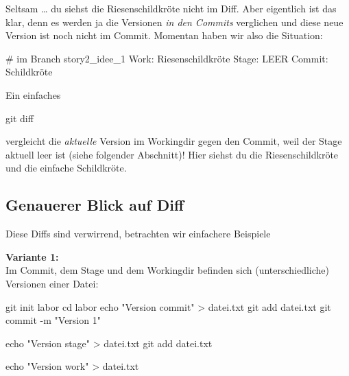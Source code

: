 \documentclass[
  letterpaper,
  DIV=11]{scrreprt}
\newenvironment{Shaded}{\begin{snugshade}}{\end{snugshade}}
\newcommand{\AttributeTok}[1]{\textcolor[rgb]{0.40,0.45,0.13}{#1}}
\newcommand{\BuiltInTok}[1]{\textcolor[rgb]{0.00,0.23,0.31}{#1}}
\newcommand{\CommentTok}[1]{\textcolor[rgb]{0.37,0.37,0.37}{#1}}
\newcommand{\ExtensionTok}[1]{\textcolor[rgb]{0.00,0.23,0.31}{#1}}
\newcommand{\FunctionTok}[1]{\textcolor[rgb]{0.28,0.35,0.67}{#1}}
\newcommand{\NormalTok}[1]{\textcolor[rgb]{0.00,0.23,0.31}{#1}}
\newcommand{\OperatorTok}[1]{\textcolor[rgb]{0.37,0.37,0.37}{#1}}
\newcommand{\StringTok}[1]{\textcolor[rgb]{0.13,0.47,0.30}{#1}}
\begin{document}
Seltsam \ldots{} du siehst die Riesenschildkröte nicht im Diff. Aber
eigentlich ist das klar, denn es werden ja die Versionen \emph{in den
Commits} verglichen und diese neue Version ist noch nicht im Commit.
Momentan haben wir also die Situation:

\begin{Shaded}
\begin{Highlighting}[]
\CommentTok{\# im Branch story2\_idee\_1}
\ExtensionTok{Work:}\NormalTok{   Riesenschildkröte}
\ExtensionTok{Stage:}\NormalTok{  LEER}
\ExtensionTok{Commit:}\NormalTok{ Schildkröte}
\end{Highlighting}
\end{Shaded}

Ein einfaches

\begin{Shaded}
\begin{Highlighting}[]
\FunctionTok{git}\NormalTok{ diff }
\end{Highlighting}
\end{Shaded}

vergleicht die \emph{aktuelle} Version im Workingdir gegen den Commit,
weil der Stage aktuell leer ist (siehe folgender Abschnitt)! Hier siehst
du die Riesenschildkröte und die einfache Schildkröte.

\subsection{Genauerer Blick auf Diff}\label{genauerer-blick-auf-diff}

Diese Diffs sind verwirrend, betrachten wir einfachere Beispiele

\textbf{Variante 1:}\\
Im Commit, dem Stage und dem Workingdir befinden sich (unterschiedliche)
Versionen einer Datei:

\begin{Shaded}
\begin{Highlighting}[]
\FunctionTok{git}\NormalTok{ init labor}
\BuiltInTok{cd}\NormalTok{ labor }
\BuiltInTok{echo} \StringTok{"Version commit"} \OperatorTok{\textgreater{}}\NormalTok{ datei.txt }
\FunctionTok{git}\NormalTok{ add datei.txt }
\FunctionTok{git}\NormalTok{ commit }\AttributeTok{{-}m} \StringTok{"Version 1"}

\BuiltInTok{echo} \StringTok{"Version stage"} \OperatorTok{\textgreater{}}\NormalTok{ datei.txt }
\FunctionTok{git}\NormalTok{ add datei.txt }

\BuiltInTok{echo} \StringTok{"Version work"} \OperatorTok{\textgreater{}}\NormalTok{ datei.txt }
\end{Highlighting}
\end{Shaded}
\end{document}
